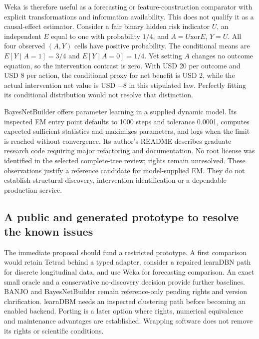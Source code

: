 Weka is therefore useful as a forecasting or feature-construction comparator
with explicit transformations and information availability. This does not
qualify it as a causal-effect estimator. Consider a fair binary hidden risk
indicator $U$, an independent $E$ equal to one with probability $1/4$, and
$A=U\mathbin{\mathrm{xor}}E$, $Y=U$. All four observed $(A,Y)$ cells have
positive probability. The conditional means are
$E[Y\mid A=1]=3/4$ and $E[Y\mid A=0]=1/4$. Yet setting $A$ changes no outcome
equation, so the intervention contrast is zero. With USD 20 per outcome and
USD 8 per action, the conditional proxy for net benefit is USD 2, while the
actual intervention net value is USD $-8$ in this stipulated law. Perfectly
fitting its conditional distribution would not resolve that distinction.
\citep{exec15_javatemporal_exact}

BayesNetBuilder offers parameter learning in a supplied dynamic model. Its
inspected EM entry point defaults to 1000 steps and tolerance 0.0001, computes
expected sufficient statistics and maximizes parameters, and logs when the
limit is reached without convergence. Its author's README describes graduate
research code requiring major refactoring and documentation. No root license
was identified in the selected complete-tree review; rights remain unresolved.
These observations justify a reference candidate for model-supplied EM. They
do not establish structural discovery, intervention identification or a
dependable production service.~\citep{exec15_javatemporal_builder}

\subsection{A public and generated prototype to resolve the known issues}

The immediate proposal should fund a restricted prototype. A first comparison
would retain Tetrad behind a typed adapter, consider a repaired learnDBN path
for discrete longitudinal data, and use Weka for forecasting comparison. An
exact small oracle and a conservative no-discovery decision provide further
baselines. BANJO and BayesNetBuilder remain reference-only pending rights and
version clarification. learnDBM needs an inspected clustering path before
becoming an enabled backend. Porting is a later option where rights, numerical
equivalence and maintenance advantages are established. Wrapping software
does not remove its rights or scientific conditions.~\citep{exec15_javatemporal_design}

